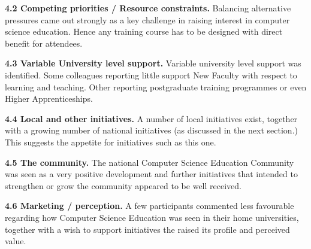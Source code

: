 \documentclass[sigconf]{acmart}
\begin{document}
\textbf{4.2 Competing priorities / Resource constraints.}
Balancing alternative pressures came out strongly as a key challenge in raising interest in computer science education. Hence any training course has to be designed with direct benefit for attendees. 

\textbf{4.3 Variable University level support.}
Variable university level support was identified. Some colleagues reporting little support New Faculty with respect to learning and teaching. Other reporting postgraduate training programmes or even Higher Apprenticeships.

\textbf{4.4 Local and other initiatives.}
A number of local initiatives exist, together with a growing number of national initiatives (as discussed in the next section.) This suggests the appetite for initiatives such as this one.

\textbf{4.5 The community.}
The national Computer Science Education Community was seen as a very positive development and further initiatives that intended to strengthen or grow the community appeared to be well received.

\textbf{4.6 Marketing / perception.}
A few participants commented less favourable regarding how Computer Science Education was seen in their home universities, together with a wish to support initiatives the raised its profile and perceived value. 
\end{document}
